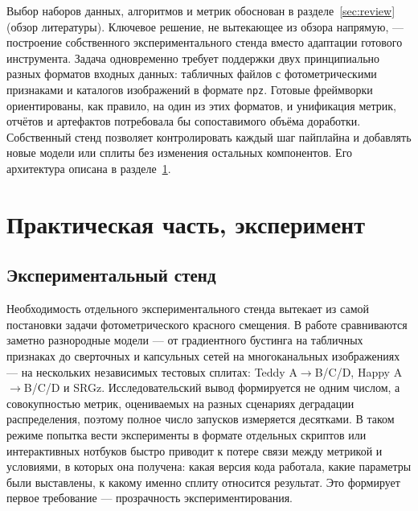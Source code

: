 \documentclass[12pt,a4paper]{article}
\begin{document}
Выбор наборов данных, алгоритмов и метрик обоснован в разделе~\ref{sec:review} (обзор литературы). Ключевое решение, не вытекающее из обзора напрямую, — построение собственного экспериментального стенда вместо адаптации готового инструмента. Задача одновременно требует поддержки двух принципиально разных форматов входных данных: табличных файлов с фотометрическими признаками и каталогов изображений в формате \texttt{npz}. Готовые фреймворки ориентированы, как правило, на один из этих форматов, и унификация метрик, отчётов и артефактов потребовала бы сопоставимого объёма доработки. Собственный стенд позволяет контролировать каждый шаг пайплайна и добавлять новые модели или сплиты без изменения остальных компонентов. Его архитектура описана в разделе~\ref{sec:experiment}.

\newpage
\section{Практическая часть, эксперимент}
\label{sec:experiment}

\subsection{Экспериментальный стенд}

Необходимость отдельного экспериментального стенда вытекает из самой постановки задачи фотометрического красного смещения. В работе сравниваются заметно разнородные модели — от градиентного бустинга на табличных признаках до сверточных и капсульных сетей на многоканальных изображениях — на нескольких независимых тестовых сплитах: Teddy A$\to$B/C/D, Happy A$\to$B/C/D и SRGz. Исследовательский вывод формируется не одним числом, а совокупностью метрик, оцениваемых на разных сценариях деградации распределения, поэтому полное число запусков измеряется десятками. В таком режиме попытка вести эксперименты в формате отдельных скриптов или интерактивных нотбуков быстро приводит к потере связи между метрикой и условиями, в которых она получена: какая версия кода работала, какие параметры были выставлены, к какому именно сплиту относится результат. Это формирует первое требование — прозрачность экспериментирования.
\end{document}
